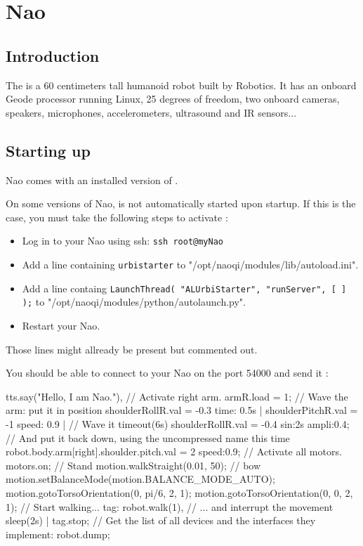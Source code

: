 \newcommand{\naoqi}{NaoQi\xspace}

\chapter{Nao}
\label{sec:nao}
\section{Introduction}

The  is a 60 centimeters tall humanoid robot built by
 Robotics.  It has an onboard Geode processor running
Linux, 25 degrees of freedom, two onboard cameras, speakers,
microphones, accelerometers, ultrasound and IR sensors...

\section{Starting up}

Nao comes with an installed version of \urbi.

On some versions of Nao, \urbi is not automatically started upon startup.
If this is the case, you must take the following steps to activate \urbi:

\begin{itemize}
\item Log in to your Nao using ssh: \lstinline|ssh root@myNao|
\item Add a line containing \lstinline|urbistarter| to
"/opt/naoqi/modules/lib/autoload.ini".
\item Add a line containg
\lstinline|LaunchThread( "ALUrbiStarter", "runServer", [ ] );| to "/opt/naoqi/modules/python/autolaunch.py".
\item Restart your Nao.
\end{itemize}

Those lines might allready be present but commented out.

You should be able to connect to your Nao on the port 54000 and send it \us:

\begin{urbiunchecked}
tts.say("Hello, I am Nao."),
// Activate right arm.
armR.load = 1;
// Wave the arm: put it in position
shoulderRollR.val = -0.3 time: 0.5s |
shoulderPitchR.val = -1 speed: 0.9 |
// Wave it
timeout(6s) shoulderRollR.val = -0.4 sin:2s ampli:0.4;
// And put it back down, using the uncompressed name this time
robot.body.arm[right].shoulder.pitch.val = 2 speed:0.9;
// Activate all motors.
motors.on;
// Stand
motion.walkStraight(0.01, 50);
// bow
motion.setBalanceMode(motion.BALANCE_MODE_AUTO);
motion.gotoTorsoOrientation(0, pi/6, 2, 1);
motion.gotoTorsoOrientation(0, 0, 2, 1);
// Start walking...
tag: robot.walk(1),
// ... and interrupt the movement
sleep(2s) | tag.stop;
// Get the list of all devices and the interfaces they implement:
robot.dump;
\end{urbiunchecked}

